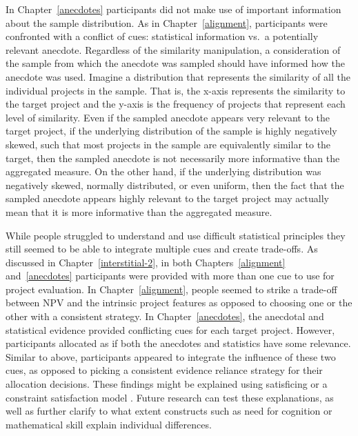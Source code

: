\documentclass[a4paper, nobind, dvipsnames]{templates/ociamthesis}
\theoremstyle{definition}
\theoremstyle{definition}
\theoremstyle{definition}
\theoremstyle{definition}
\theoremstyle{remark}
\begin{document}
In Chapter~\ref{anecdotes} participants did not make use of important
information about the sample distribution. As in Chapter~\ref{alignment},
participants were confronted with a conflict of cues: statistical information
vs.~a potentially relevant anecdote. Regardless of the similarity manipulation,
a consideration of the sample from which the anecdote was sampled should have
informed how the anecdote was used. Imagine a distribution that represents the
similarity of all the individual projects in the sample. That is, the x-axis
represents the similarity to the target project and the y-axis is the frequency
of projects that represent each level of similarity. Even if the sampled
anecdote appears very relevant to the target project, if the underlying
distribution of the sample is highly negatively skewed, such that most projects
in the sample are equivalently similar to the target, then the sampled anecdote
is not necessarily more informative than the aggregated measure. On the other
hand, if the underlying distribution was negatively skewed, normally
distributed, or even uniform, then the fact that the sampled anecdote appears
highly relevant to the target project may actually mean that it is more
informative than the aggregated measure.

While people struggled to understand and use difficult statistical principles
they still seemed to be able to integrate multiple cues and create trade-offs.
As discussed in Chapter~\ref{interstitial-2}, in both Chapters~\ref{alignment}
and~\ref{anecdotes} participants were provided with more than one cue to use
for project evaluation. In Chapter~\ref{alignment}, people seemed to strike a
trade-off between NPV and the intrinsic project features as opposed to choosing
one or the other with a consistent strategy. In Chapter~\ref{anecdotes}, the
anecdotal and statistical evidence provided conflicting cues for each target
project. However, participants allocated as if both the anecdotes and statistics
have some relevance. Similar to above, participants appeared to integrate the
influence of these two cues, as opposed to picking a consistent evidence
reliance strategy for their allocation decisions. These findings might be
explained using satisficing \autocite{simon1955} or a constraint satisfaction model
\autocite[e.g.,][]{glockner2014}. Future research can test these explanations, as well as
further clarify to what extent constructs such as need for cognition or
mathematical skill explain individual differences.
\end{document}
